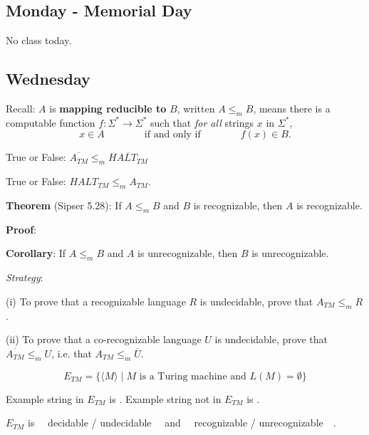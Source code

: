 \documentclass[12pt, oneside]{article}
\begin{document}
\begin{flushright}
\end{flushright} 
\subsection*{Monday - Memorial Day}
No class today.

\subsection*{Wednesday}





Recall:  $A$ is  {\bf  mapping  reducible to} $B$, written $A \leq_m B$,  means there is a computable function 
$f : \Sigma^* \to \Sigma^*$ such that {\it for all} strings  $x$ in $\Sigma^*$, 
\[
x  \in  A \qquad \qquad \text{if and  only  if} \qquad \qquad f(x) \in B.
\]

True or False: $\overline{A_{TM}} \leq_m \overline{HALT_{TM}}$

\vfill

True or False: $HALT_{TM} \leq_m A_{TM}$.

\vfill


{\bf Theorem} (Sipser 5.28): If $A \leq_m B$ and $B$ is recognizable, then $A$ is recognizable.

{\bf Proof}: 

\vfill

{\bf Corollary}: If  $A \leq_m B$ and $A$ is unrecognizable, then $B$ is unrecognizable.

\vfill

\newpage
{\it Strategy}:  

(i) To prove that a  recognizable language $R$ is undecidable, prove that $A_{TM} \leq_m R$.


(ii) To prove that a co-recognizable language $U$ is undecidable, prove that $\overline{A_{TM}} \leq_m U$,
 i.e. that $A_{TM} \leq_m \overline{U}$.

 

\[
E_{TM} = \{ \langle M \rangle \mid \text{$M$ is a Turing machine and $L(M) = \emptyset$} \}
\]

Example  string in  $E_{TM}$ is \underline{\phantom{\hspace{1.6in}}} .
Example  string not  in  $E_{TM}$ is \underline{\phantom{\hspace{1.6in}}} .

$E_{TM}$ is ~~decidable /  undecidable~~ and ~~recognizable /  unrecognizable~~.
\end{document}
